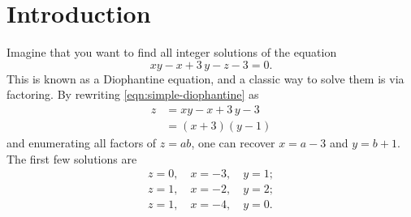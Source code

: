\section{Introduction}

Imagine that you want to find all integer solutions of the equation
\begin{equation}
    \label{eqn:simple-diophantine}
    x y - x + 3 \, y - z - 3 = 0.
\end{equation}
This is known as a Diophantine equation, and a classic way to solve them is via factoring. By rewriting \autoref{eqn:simple-diophantine} as
\begin{equation}
    \begin{aligned}
        z & = x y - x + 3 \, y - 3                 \\
          & = \left(x + 3\right)\left(y - 1\right)
    \end{aligned}
\end{equation}
and enumerating all factors of $z = ab$, one can recover $x = a - 3$ and $y = b + 1$. The first few solutions are
\begin{equation}
    \begin{gathered}
        z = 0, \quad
        x = -3, \quad
        y = 1; \\
        z = 1, \quad
        x = -2, \quad
        y = 2; \\
        z = 1, \quad
        x = -4, \quad
        y = 0.
    \end{gathered}
\end{equation}

